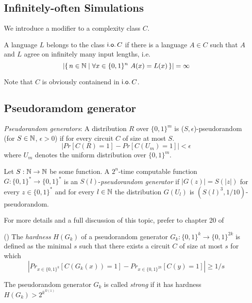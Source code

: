 \documentclass[11pt]{article}
\begin{document}
\subsection{Infinitely-often Simulations}

We introduce a modifier to a complexity class $C$.

\begin{definition}
  A language $L$ belongs to the class
  $\mathsf{i.o.}\, C$ if there is a language $A \in C$ such that
  $A$ and $L$ agree on infinitely many input lengths, i.e.
  \[
    |\set{ n \in \N \mid \forall x \in \{0,1\}^n\ A(x) = L(x) }| = \infty
  \]
\end{definition}

Note that $C$ is obviously containend in $\mathsf{i.o.}\, C$.



\subsection{Pseudoramdom generator}
\label{subsect:pseudorandom}
\begin{definition}
	\textit{Pseudorandom generators}: A distribution $R$ over $\{0, 1\}^m$ is ($S, \epsilon$)-pseudorandom (for $S \in {\mathbb{N}}$, $\epsilon > 0$) if for every circuit $C$ of size at most $S$.
	\[|Pr[C(R) = 1] - Pr[C(U_m) = 1]| < \epsilon\]
	where $U_m$ denotes the uniform distribution over $\{0, 1\}^m$.
	
	Let $S: {\mathbb{N}} \rightarrow {\mathbb{N}}$ be some function. A $2^n$-time computable function $G: \{0, 1\}^* \rightarrow \{0, 1\}^*$ is an $S(l)$-\textit{pseudorandom generator} if $|G(z)| = S(|z|)$ for every $z \in \{0, 1\}^*$ and for every $l \in {\mathbb{N}}$ the distribution $G(U_l)$ is $(S(l)^3, 1/10)$-pseudorandom.
	
	For more details and a full discussion of this topic, prefer to chapter 20 of \cite{arora2009}
\end{definition}

\begin{definition} (\cite{10.1145/335305.335314})
	The \textit{hardness} $H(G_k)$ of a pseudorandom generator $G_k: \{0, 1\}^k \rightarrow \{0, 1\}^{2k}$ is defined as the minimal $s$ such that there exists a circuit $C$ of size at most $s$ for which
	\[|Pr_{x \in \{0, 1\}^k}[C(G_k(x)) = 1] - Pr_{x \in \{0, 1\}^{2k}}[C(y) = 1]| \geq 1/s\]
	
	The pseudorandom generator $G_k$ is called \textit{strong} if it has hardness $H(G_k) > 2^{k^{\Omega(1)}}$ 
\end{definition}
\end{document}
